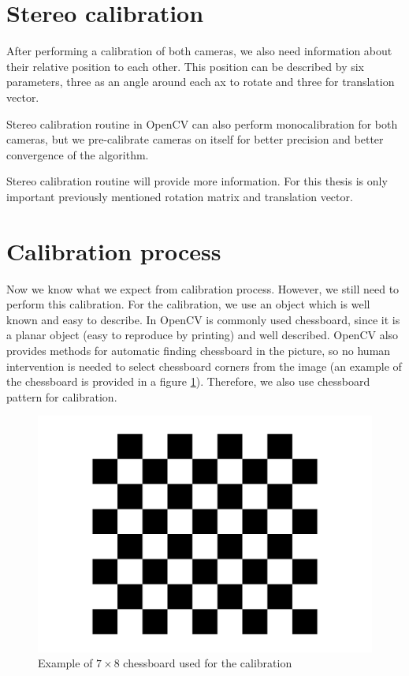 \section{Stereo calibration}

After performing a calibration of both cameras, we also need information about
their relative position to each other. This position can be described by six
parameters, three as an angle around each ax to rotate and three for
translation vector.

Stereo calibration routine in OpenCV can also perform monocalibration for both
cameras, but we pre-calibrate cameras on itself for better precision and better
convergence of the algorithm.

Stereo calibration routine will provide more information. For this thesis is
only important previously mentioned rotation matrix and translation vector.

\section{Calibration process}

Now we know what we expect from calibration process. However, we still need to
perform this calibration. For the calibration, we use an object which is well
known and easy to describe. In OpenCV is commonly used chessboard, since it is
a planar object (easy to reproduce by printing) and well described. OpenCV also
provides methods for automatic finding chessboard in the picture, so no human
intervention is needed to select chessboard corners from the image (an example
of the chessboard is provided in a figure \ref{fig:chessboard}). Therefore, we
also use chessboard pattern for calibration.

\begin{figure}
	\centering
	\includegraphics[width=0.8\linewidth]{img/chessboard/7x8chessboard}
	\caption{Example of $7\times8$ chessboard used for the calibration}
	\label{fig:chessboard}
\end{figure}

